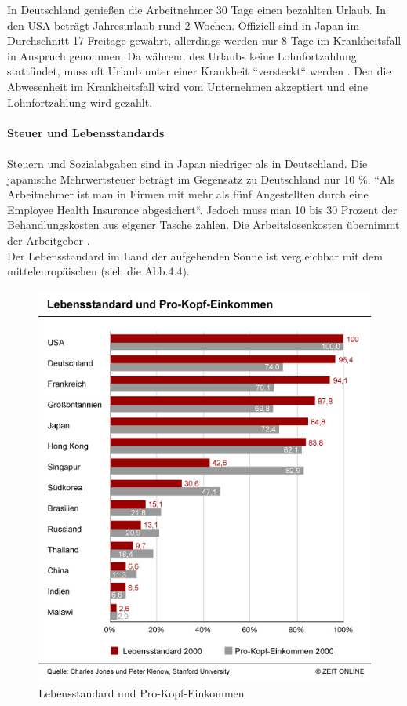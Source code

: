 	In Deutschland genießen die Arbeitnehmer 30 Tage einen bezahlten Urlaub. In den USA beträgt Jahresurlaub rund 2 Wochen. Offiziell sind in Japan im Durchschnitt 17 Freitage gewährt, allerdings werden nur 8 Tage im Krankheitsfall in Anspruch genommen. Da während des Urlaubs keine Lohnfortzahlung stattfindet, muss oft Urlaub unter einer Krankheit ``versteckt`` werden \cite{JPArbeitSozKultur}. Den die Abwesenheit im Krankheitsfall wird vom Unternehmen akzeptiert und eine Lohnfortzahlung wird gezahlt.\\
	\\
		\textbf{Steuer und Lebensstandards}\\
		\\
		Steuern und Sozialabgaben sind in Japan niedriger als in Deutschland. Die japanische Mehrwertsteuer beträgt im Gegensatz zu Deutschland nur 10 \%.
		``Als Arbeitnehmer ist man in Firmen mit mehr als fünf Angestellten durch eine Employee Health Insurance abgesichert``. Jedoch muss man 10 bis 30 Prozent der Behandlungskosten aus eigener Tasche zahlen. Die Arbeitslosenkosten übernimmt der Arbeitgeber \cite{ArbZeitJP}.
		\\Der Lebensstandard im Land der aufgehenden Sonne ist vergleichbar mit dem mitteleuropäischen (sieh die Abb.4.4).
		\begin{figure}[ht]
		\centering
		\includegraphics[width=0.7\linewidth]{./images/Lebensstandard-Pro-Kopf-Einkommen}
		\caption{Lebensstandard und Pro-Kopf-Einkommen \cite{LebensStd}}
		\label{fig:LebStdProKEink}
		\end{figure}\\

